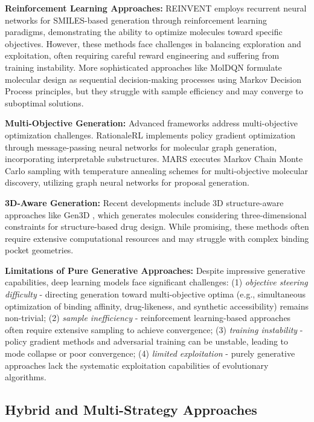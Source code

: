 \documentclass[lettersize,journal]{IEEEtran}
\begin{document}
\noindent \textbf{Reinforcement Learning Approaches:} REINVENT \cite{olivecronaMolecularDeNovoDesign2017} employs recurrent neural networks for SMILES-based generation through reinforcement learning paradigms, demonstrating the ability to optimize molecules toward specific objectives. However, these methods face challenges in balancing exploration and exploitation, often requiring careful reward engineering and suffering from training instability. More sophisticated approaches like MolDQN \cite{zhouOptimizationMolecularRep2019} formulate molecular design as sequential decision-making processes using Markov Decision Process principles, but they struggle with sample efficiency and may converge to suboptimal solutions.

\noindent \textbf{Multi-Objective Generation:} Advanced frameworks address multi-objective optimization challenges. RationaleRL \cite{jinMultiObjectiveMoleculeGeneration2020} implements policy gradient optimization through message-passing neural networks for molecular graph generation, incorporating interpretable substructures. MARS \cite{xieMARS2021} executes Markov Chain Monte Carlo sampling with temperature annealing schemes for multi-objective molecular discovery, utilizing graph neural networks for proposal generation.

\noindent \textbf{3D-Aware Generation:} Recent developments include 3D structure-aware approaches like Gen3D \cite{luoGraph2022}, which generates molecules considering three-dimensional constraints for structure-based drug design. While promising, these methods often require extensive computational resources and may struggle with complex binding pocket geometries.

\noindent \textbf{Limitations of Pure Generative Approaches:} Despite impressive generative capabilities, deep learning models face significant challenges: (1) \textit{objective steering difficulty} - directing generation toward multi-objective optima (e.g., simultaneous optimization of binding affinity, drug-likeness, and synthetic accessibility) remains non-trivial; (2) \textit{sample inefficiency} - reinforcement learning-based approaches often require extensive sampling to achieve convergence; (3) \textit{training instability} - policy gradient methods and adversarial training can be unstable, leading to mode collapse or poor convergence; (4) \textit{limited exploitation} - purely generative approaches lack the systematic exploitation capabilities of evolutionary algorithms.

\subsection{Hybrid and Multi-Strategy Approaches}
\end{document}
